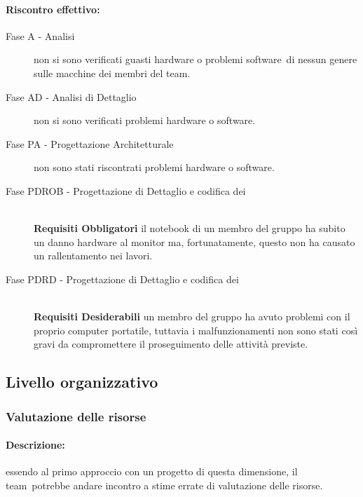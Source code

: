 \documentclass[../PianoProgetto.tex]{subfiles}
\begin{document}
	\paragraph*{Riscontro effettivo:}
		\begin{description}
			\item[Fase A - Analisi] non si sono verificati guasti hardware o problemi software\g\ di nessun genere sulle macchine dei membri del team\g .
			\item[Fase AD - Analisi di Dettaglio] non si sono verificati problemi hardware o software\g.
			\item[Fase PA - Progettazione Architetturale] non sono stati riscontrati problemi hardware o software\g.
			\item[Fase PDROB - Progettazione di Dettaglio e codifica dei]  \ \\
					\textbf{Requisiti Obbligatori} il notebook di un membro del gruppo ha subito un danno hardware al monitor ma, fortunatamente, questo non ha causato un rallentamento nei lavori.
			\item[Fase PDRD - Progettazione di Dettaglio e codifica dei] \ \\
					\textbf{Requisiti Desiderabili} un membro del gruppo ha avuto problemi con il proprio computer portatile, tuttavia i malfunzionamenti non sono stati così gravi da compromettere il proseguimento delle attività previste.
		\end{description}

\newpage
\subsection{Livello organizzativo}

\subsubsection{Valutazione delle risorse}
\label{sec:Valutazione delle risorse}

	\paragraph*{Descrizione:} essendo al primo approccio con un progetto di questa dimensione, il team\g\ potrebbe andare incontro a stime errate di valutazione delle risorse.
	
\end{document}
